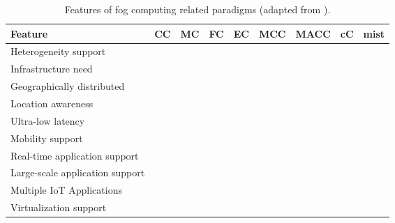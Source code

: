 \begin{table}
	\caption{Features of fog computing related paradigms (adapted from \cite{yousefpour2018all}).}
	\scriptsize
	\begin{tabular*}{\textwidth}{l >{\centering\arraybackslash}m{0.43in} >{\centering\arraybackslash}m{0.43in} >{\centering\arraybackslash}m{0.43in} >{\centering\arraybackslash}m{0.43in} >{\centering\arraybackslash}m{0.43in} >{\centering\arraybackslash}m{0.43in} >{\centering\arraybackslash}m{0.43in} >{\centering\arraybackslash}m{0.43in}}
		\toprule
		\centering\textbf{Feature} & \textbf{CC} & \textbf{MC} & \textbf{FC} & \textbf{EC} & \textbf{MCC} & \textbf{MACC} & \textbf{cC} & \textbf{mist} \\[2pt]
		\toprule
		Heterogeneity support & \cmark &  & \cmark & \cmark & \cmark &  &  & \cmark \\ \midrule
		Infrastructure need & \cmark &  & \cmark & \cmark & \cmark &  & \cmark & \cmark \\ \midrule
		Geographically distributed &  &  & \cmark & \cmark &  &  & \cmark & \cmark \\ \midrule
		Location awareness &  & \cmark & \cmark & \cmark &  & \cmark & \cmark & \cmark \\ \midrule
		Ultra-low latency &  &  & \cmark & \cmark &  &  & \cmark & \cmark \\ \midrule
		Mobility support &  & \cmark & \cmark & \cmark & \cmark & \cmark & \cmark & \cmark \\ \midrule
		Real-time application support &  &  & \cmark & \cmark &  &  & \cmark & \cmark \\ \midrule
		Large-scale application support & \cmark &  & \cmark & \cmark &  &  &  & \cmark \\ \midrule
		Multiple IoT Applications & \cmark &  & \cmark &  &  &  & \cmark & \cmark \\ \midrule
		Virtualization support & \cmark &  & \cmark &  &  &  & \cmark &  \\ \bottomrule
	\end{tabular*}
	\label{computing_paradigms}
	\vspace{-5mm}
\end{table}